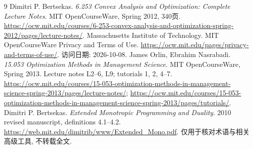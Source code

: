 \begin{thebibliography}{9}
 Dimitri P. Bertsekas. \emph{6.253 Convex Analysis and Optimization: Complete Lecture Notes}. MIT OpenCourseWare, Spring 2012, 340页. \url{https://ocw.mit.edu/courses/6-253-convex-analysis-and-optimization-spring-2012/pages/lecture-notes/}.
 Massachusetts Institute of Technology. MIT OpenCourseWare Privacy and Terms of Use. \url{https://ocw.mit.edu/pages/privacy-and-terms-of-use/}. 访问日期: 2026-10-08.
 James Orlin, Ebrahim Nasrabadi. \emph{15.053 Optimization Methods in Management Science}. MIT OpenCourseWare, Spring 2013. Lecture notes L2--6, L9; tutorials 1, 2, 4--7. \url{https://ocw.mit.edu/courses/15-053-optimization-methods-in-management-science-spring-2013/pages/lecture-notes/}; \url{https://ocw.mit.edu/courses/15-053-optimization-methods-in-management-science-spring-2013/pages/tutorials/}.
 Dimitri P. Bertsekas. \emph{Extended Monotropic Programming and Duality}. 2010 revised manuscript, definitions 4.1--4.2. \url{https://web.mit.edu/dimitrib/www/Extended_Mono.pdf}. 仅用于核对术语与相关高级工具, 不转载全文.
\end{thebibliography}
